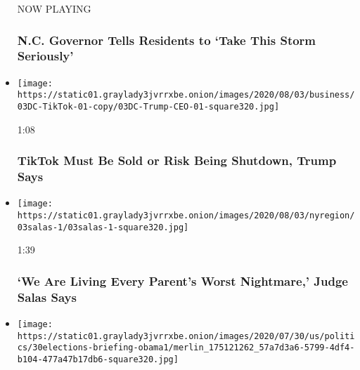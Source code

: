 \begin{itemize}
  NOW PLAYING

  \hypertarget{nc-governor-tells-residents-to-take-this-storm-seriously-2}{%
  \subsubsection{N.C. Governor Tells Residents to `Take This Storm
  Seriously'}\label{nc-governor-tells-residents-to-take-this-storm-seriously-2}}
\item
  \href{https://www.nytimes3xbfgragh.onion/video/us/100000007270771/trump-tiktok-shutdown-microsoft.html?action=click\&module=video-series-bar\&region=header\&pgtype=Article\&playlistId=video/u-s}{}

  \texttt{[image: https://static01.graylady3jvrrxbe.onion/images/2020/08/03/business/03DC-TikTok-01-copy/03DC-Trump-CEO-01-square320.jpg]}

  1:08

  \hypertarget{tiktok-must-be-sold-or-risk-being-shutdown-trump-says}{%
  \subsubsection{TikTok Must Be Sold or Risk Being Shutdown, Trump
  Says}\label{tiktok-must-be-sold-or-risk-being-shutdown-trump-says}}
\item
  \href{https://www.nytimes3xbfgragh.onion/video/us/100000007269993/judge-salas-new-jersey.html?action=click\&module=video-series-bar\&region=header\&pgtype=Article\&playlistId=video/u-s}{}

  \texttt{[image: https://static01.graylady3jvrrxbe.onion/images/2020/08/03/nyregion/03salas-1/03salas-1-square320.jpg]}

  1:39

  \hypertarget{we-are-living-every-parents-worst-nightmare-judge-salas-says}{%
  \subsubsection{`We Are Living Every Parent's Worst Nightmare,' Judge
  Salas
  Says}\label{we-are-living-every-parents-worst-nightmare-judge-salas-says}}
\item
  \href{https://www.nytimes3xbfgragh.onion/video/us/100000007264733/obama-john-lewis-funeral.html?action=click\&module=video-series-bar\&region=header\&pgtype=Article\&playlistId=video/u-s}{}

  \texttt{[image: https://static01.graylady3jvrrxbe.onion/images/2020/07/30/us/politics/30elections-briefing-obama1/merlin\_175121262\_57a7d3a6-5799-4df4-b104-477a47b17db6-square320.jpg]}


\end{itemize}
